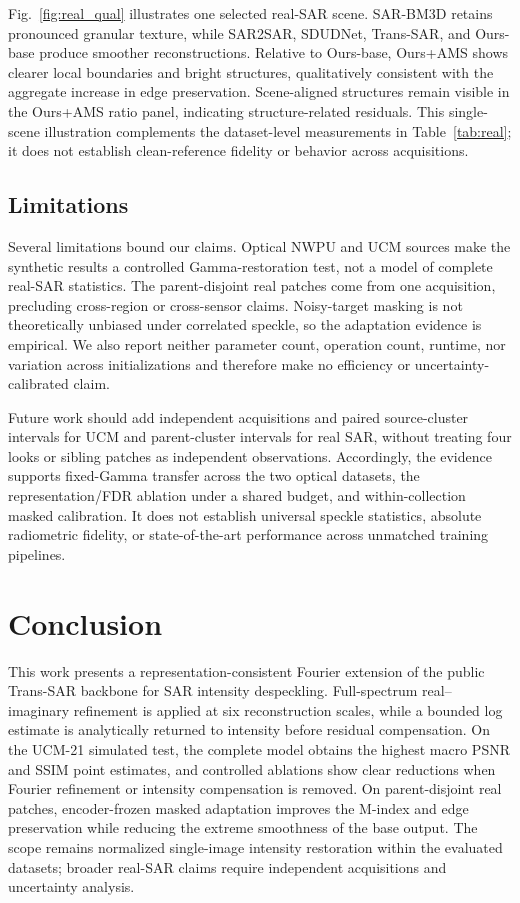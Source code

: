 \documentclass[conference]{IEEEtran}
\begin{document}
Fig.~\ref{fig:real_qual} illustrates one selected real-SAR scene. SAR-BM3D retains pronounced granular texture, while SAR2SAR, SDUDNet, Trans-SAR, and Ours-base produce smoother reconstructions. Relative to Ours-base, Ours+AMS shows clearer local boundaries and bright structures, qualitatively consistent with the aggregate increase in edge preservation. Scene-aligned structures remain visible in the Ours+AMS ratio panel, indicating structure-related residuals. This single-scene illustration complements the dataset-level measurements in Table~\ref{tab:real}; it does not establish clean-reference fidelity or behavior across acquisitions.

\subsection{Limitations}
Several limitations bound our claims. Optical NWPU and UCM sources make the synthetic results a controlled Gamma-restoration test, not a model of complete real-SAR statistics. The parent-disjoint real patches come from one acquisition, precluding cross-region or cross-sensor claims. Noisy-target masking is not theoretically unbiased under correlated speckle, so the adaptation evidence is empirical. We also report neither parameter count, operation count, runtime, nor variation across initializations and therefore make no efficiency or uncertainty-calibrated claim.

Future work should add independent acquisitions and paired source-cluster intervals for UCM and parent-cluster intervals for real SAR, without treating four looks or sibling patches as independent observations. Accordingly, the evidence supports fixed-Gamma transfer across the two optical datasets, the representation/FDR ablation under a shared budget, and within-collection masked calibration. It does not establish universal speckle statistics, absolute radiometric fidelity, or state-of-the-art performance across unmatched training pipelines.

\section{Conclusion}
This work presents a representation-consistent Fourier extension of the public Trans-SAR backbone for SAR intensity despeckling. Full-spectrum real--imaginary refinement is applied at six reconstruction scales, while a bounded log estimate is analytically returned to intensity before residual compensation. On the UCM-21 simulated test, the complete model obtains the highest macro PSNR and SSIM point estimates, and controlled ablations show clear reductions when Fourier refinement or intensity compensation is removed. On parent-disjoint real patches, encoder-frozen masked adaptation improves the M-index and edge preservation while reducing the extreme smoothness of the base output. The scope remains normalized single-image intensity restoration within the evaluated datasets; broader real-SAR claims require independent acquisitions and uncertainty analysis.
\end{document}
